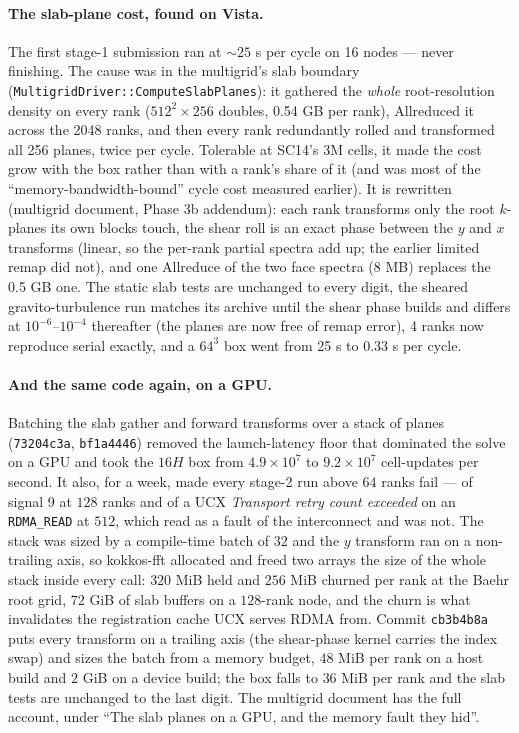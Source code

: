 \documentclass[11pt]{article}
\newcommand{\code}[1]{\texttt{#1}}
\newcommand{\fn}[1]{\texttt{\small #1}}
\begin{document}
\paragraph{The slab-plane cost, found on Vista.} The first stage-1 submission ran at
$\sim25$ s per cycle on 16 nodes --- never finishing. The cause was in the multigrid's
slab boundary (\fn{MultigridDriver::ComputeSlabPlanes}): it gathered the \emph{whole}
root-resolution density on every rank ($512^2\times256$ doubles, 0.54 GB per rank),
Allreduced it across the 2048 ranks, and then every rank redundantly rolled and
transformed all 256 planes, twice per cycle. Tolerable at SC14's 3M cells, it made the
cost grow with the box rather than with a rank's share of it (and was most of the
``memory-bandwidth-bound'' cycle cost measured earlier). It is rewritten
(multigrid document, Phase 3b addendum): each rank transforms only the root $k$-planes
its own blocks touch, the shear roll is an exact phase between the $y$ and $x$
transforms (linear, so the per-rank partial spectra add up; the earlier limited remap
did not), and one Allreduce of the two face spectra (8 MB) replaces the 0.5 GB one.
The static slab tests are unchanged to every digit, the sheared gravito-turbulence run
matches its archive until the shear phase builds and differs at $10^{-6}$--$10^{-4}$
thereafter (the planes are now free of remap error), 4 ranks now reproduce serial
exactly, and a $64^3$ box went from 25 s to 0.33 s per cycle.

\paragraph{And the same code again, on a GPU.} Batching the slab gather and forward
transforms over a stack of planes (\code{73204c3a}, \code{bf1a4446}) removed the
launch-latency floor that dominated the solve on a GPU and took the $16H$ box from
$4.9\times10^{7}$ to $9.2\times10^{7}$ cell-updates per second. It also, for a week,
made every stage-2 run above $64$ ranks fail --- of signal 9 at $128$ ranks and of a UCX
\emph{Transport retry count exceeded} on an \code{RDMA\_READ} at $512$, which read as a
fault of the interconnect and was not. The stack was sized by a compile-time batch of
$32$ and the $y$ transform ran on a non-trailing axis, so kokkos-fft allocated and freed
two arrays the size of the whole stack inside every call: $320$ MiB held and $256$ MiB
churned per rank at the Baehr root grid, $72$ GiB of slab buffers on a $128$-rank node,
and the churn is what invalidates the registration cache UCX serves RDMA from.
Commit \code{cb3b4b8a} puts every transform on a trailing axis (the shear-phase kernel
carries the index swap) and sizes the batch from a memory budget, $48$ MiB per rank on a
host build and $2$ GiB on a device build; the box falls to $36$ MiB per rank and the
slab tests are unchanged to the last digit. The multigrid document has the full
account, under ``The slab planes on a GPU, and the memory fault they hid''.
\end{document}
